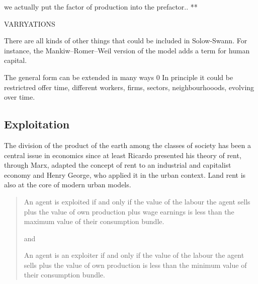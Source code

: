 we actually put the factor of production into the prefactor.. ** 





VARRYATIONS

There are all kinds of other things that could be included in Solow-Swann. For instance, the Mankiw–Romer–Weil version of the model adds a term for human capital.

The general form can be extended in many ways 0 
 In principle it could be restrictred offer time, different workers, firms, sectors, neighbourhooods, evolving over time.


\subsection{Exploitation}\label{Sec:Exploitation: A Note}
The division of the product of the earth among the classes of society has been a central issue in economics since at least Ricardo presented his theory of  rent, through Marx, adapted the concept of rent to an industrial and capitalist economy and Henry George, who applied it in the urban context. Land rent is also at the core of modern urban models. 

\begin{quotation}

An agent is exploited  if and only if the value of the labour the agent sells plus the value of own production plus wage earnings is less than the maximum value of their consumption bundle.\vspace{.25cm}

and\vspace{.25cm}

An agent is an exploiter  if and only if the value of the labour the agent sells plus the value of own production is less than the minimum value of their consumption bundle.
\end{quotation}

